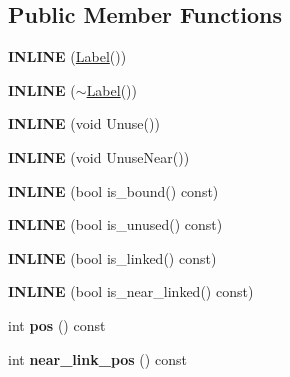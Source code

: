 \subsection*{Public Member Functions}
\begin{DoxyCompactItemize}
\item 
{\bfseries I\+N\+L\+I\+NE} (\hyperlink{classv8_1_1internal_1_1_label}{Label}())\hypertarget{classv8_1_1internal_1_1_label_a33015de1d114ac99d19cbc5c2eda3313}{}\label{classv8_1_1internal_1_1_label_a33015de1d114ac99d19cbc5c2eda3313}

\item 
{\bfseries I\+N\+L\+I\+NE} ($\sim$\hyperlink{classv8_1_1internal_1_1_label}{Label}())\hypertarget{classv8_1_1internal_1_1_label_a214d226e22719ac6c5bd63a2bdc3c122}{}\label{classv8_1_1internal_1_1_label_a214d226e22719ac6c5bd63a2bdc3c122}

\item 
{\bfseries I\+N\+L\+I\+NE} (void Unuse())\hypertarget{classv8_1_1internal_1_1_label_a1354994651e775080cb3825320e9b1bc}{}\label{classv8_1_1internal_1_1_label_a1354994651e775080cb3825320e9b1bc}

\item 
{\bfseries I\+N\+L\+I\+NE} (void Unuse\+Near())\hypertarget{classv8_1_1internal_1_1_label_a9bd8522bc46d5f8a5fa19d0cd7b54246}{}\label{classv8_1_1internal_1_1_label_a9bd8522bc46d5f8a5fa19d0cd7b54246}

\item 
{\bfseries I\+N\+L\+I\+NE} (bool is\+\_\+bound() const)\hypertarget{classv8_1_1internal_1_1_label_a234ba5405a62b005037f8afdefa1760a}{}\label{classv8_1_1internal_1_1_label_a234ba5405a62b005037f8afdefa1760a}

\item 
{\bfseries I\+N\+L\+I\+NE} (bool is\+\_\+unused() const)\hypertarget{classv8_1_1internal_1_1_label_ae7728fc879ecdbe97fcc2626288e4535}{}\label{classv8_1_1internal_1_1_label_ae7728fc879ecdbe97fcc2626288e4535}

\item 
{\bfseries I\+N\+L\+I\+NE} (bool is\+\_\+linked() const)\hypertarget{classv8_1_1internal_1_1_label_ad7a0fc8986fe6b69d9e733ee246f82a7}{}\label{classv8_1_1internal_1_1_label_ad7a0fc8986fe6b69d9e733ee246f82a7}

\item 
{\bfseries I\+N\+L\+I\+NE} (bool is\+\_\+near\+\_\+linked() const)\hypertarget{classv8_1_1internal_1_1_label_a199c45e7ece12879cf12a2a603ac58a9}{}\label{classv8_1_1internal_1_1_label_a199c45e7ece12879cf12a2a603ac58a9}

\item 
int {\bfseries pos} () const \hypertarget{classv8_1_1internal_1_1_label_a2d2007a8af2116fc17b8d89c8f8af434}{}\label{classv8_1_1internal_1_1_label_a2d2007a8af2116fc17b8d89c8f8af434}

\item 
int {\bfseries near\+\_\+link\+\_\+pos} () const \hypertarget{classv8_1_1internal_1_1_label_afb1ade6958a31a04e666124b7e2d4eb1}{}\label{classv8_1_1internal_1_1_label_afb1ade6958a31a04e666124b7e2d4eb1}

\end{DoxyCompactItemize}
